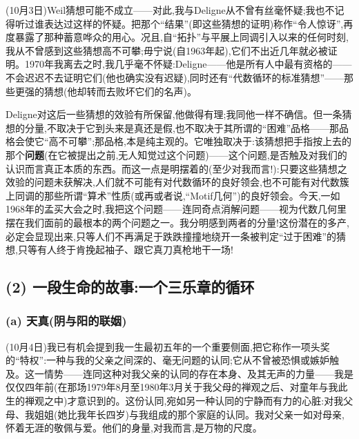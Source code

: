 \label{ch18:local:n4}

\dmark{}(10月3日)Weil猜想可能不成立——对此,我与Deligne从不曾有丝毫怀疑;我也不记得听过谁表达过这样的怀疑。把那个“结果”(即这些猜想的证明)称作“令人惊讶”,再度暴露了那种蓄意哗众的用心。况且,自“拓扑”与平展上同调引入以来的任何时刻,我从不曾感到这些猜想高不可攀;毋宁说(自1963年起),它们不出近几年就必被证明。1970年我离去之时,我几乎毫不怀疑:Deligne——他是所有人中最有资格的——不会迟迟不去证明它们(他也确实没有迟疑),同时还有“代数循环的标准猜想”——那些更强的猜想(他却转而去败坏它们的名声)。

Deligne对这后一些猜想的效验有所保留,他做得有理;我同他一样不确信。但一条猜想的分量,不取决于它到头来是真还是假,也不取决于其所谓的“困难”品格——那品格会使它“高不可攀”;那品格,本是纯主观的。它唯独取决于:该猜想把手指按上去的那个\textbf{问题}(在它被提出之前,无人知觉过这个问题)——这个问题,是否触及对我们的认识而言真正本质的东西。而这一点是明摆着的(至少对我而言!):只要这些猜想之效验的问题未获解决,人们就不可能有对代数循环的良好领会,也不可能有对代数簇上同调的那些所谓“算术”性质(或再或者说,“Motif几何”)的良好领会。今天,一如1968年的孟买大会之时,我把这个问题——连同奇点消解问题——视为代数几何里摆在我们面前的最根本的两个问题之一。我分明感到两者的分量!这份潜在的多产,必定会显现出来,只等人们不再满足于跌跌撞撞地绕开一条被判定“过于困难”的猜想,只等有人终于肯挽起袖子、跟它真刀真枪地干一场!

\subsection{(2) 一段生命的故事:一个三乐章的循环}
\label{ch18:local:h6}

\subsubsection*{(a) 天真(阴与阳的联姻)}
\label{ch18:local:h7}

\label{ch18:local:n5}

\dmark{}(10月4日)我已有机会提到我一生最初五年的一个重要侧面,把它称作一项头奖的“特权”:一种与我的父亲之间深的、毫无问题的认同;它从不曾被恐惧或嫉妒触及。这一情势——连同这种对我父亲的认同的存在本身、及其无声的力量——我是仅仅四年前(在那场1979年8月至1980年3月关于我父母的禅观之后、对童年与我此生的禅观之中)才意识到的。这份认同,宛如另一种认同的宁静而有力的心脏:对我父母、我姐姐(她比我年长四岁)与我组成的那个家庭的认同。我对父亲一如对母亲,怀着无涯的敬佩与爱。他们的身量,对我而言,是万物的尺度。

